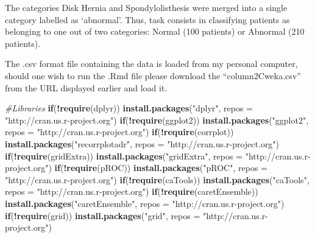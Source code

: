 \documentclass[
]{article}
\newenvironment{Shaded}{\begin{snugshade}}{\end{snugshade}}
\newcommand{\CommentTok}[1]{\textcolor[rgb]{0.56,0.35,0.01}{\textit{#1}}}
\newcommand{\ControlFlowTok}[1]{\textcolor[rgb]{0.13,0.29,0.53}{\textbf{#1}}}
\newcommand{\DataTypeTok}[1]{\textcolor[rgb]{0.13,0.29,0.53}{#1}}
\newcommand{\KeywordTok}[1]{\textcolor[rgb]{0.13,0.29,0.53}{\textbf{#1}}}
\newcommand{\NormalTok}[1]{#1}
\newcommand{\OperatorTok}[1]{\textcolor[rgb]{0.81,0.36,0.00}{\textbf{#1}}}
\newcommand{\StringTok}[1]{\textcolor[rgb]{0.31,0.60,0.02}{#1}}
\begin{document}
The categories Disk Hernia and Spondylolisthesis were merged into a
single category labelled as `abnormal'. Thus, task consists in
classifying patients as belonging to one out of two categories: Normal
(100 patients) or Abnormal (210 patients).

The .csv format file containing the data is loaded from my personal
computer, should one wish to run the .Rmd file please download the
``column2Cweka.csv'' from the URL displayed earlier and load it.

\begin{Shaded}
\begin{Highlighting}[]
\CommentTok{#Libraries}
\ControlFlowTok{if}\NormalTok{(}\OperatorTok{!}\KeywordTok{require}\NormalTok{(dplyr)) }\KeywordTok{install.packages}\NormalTok{(}\StringTok{"dplyr"}\NormalTok{, }\DataTypeTok{repos =} \StringTok{"http://cran.us.r-project.org"}\NormalTok{)}
\ControlFlowTok{if}\NormalTok{(}\OperatorTok{!}\KeywordTok{require}\NormalTok{(ggplot2)) }\KeywordTok{install.packages}\NormalTok{(}\StringTok{"ggplot2"}\NormalTok{, }\DataTypeTok{repos =} \StringTok{"http://cran.us.r-project.org"}\NormalTok{)}
\ControlFlowTok{if}\NormalTok{(}\OperatorTok{!}\KeywordTok{require}\NormalTok{(corrplot)) }\KeywordTok{install.packages}\NormalTok{(}\StringTok{"recorrplotadr"}\NormalTok{, }\DataTypeTok{repos =} \StringTok{"http://cran.us.r-project.org"}\NormalTok{)}
\ControlFlowTok{if}\NormalTok{(}\OperatorTok{!}\KeywordTok{require}\NormalTok{(gridExtra)) }\KeywordTok{install.packages}\NormalTok{(}\StringTok{"gridExtra"}\NormalTok{, }\DataTypeTok{repos =} \StringTok{"http://cran.us.r-project.org"}\NormalTok{)}
\ControlFlowTok{if}\NormalTok{(}\OperatorTok{!}\KeywordTok{require}\NormalTok{(pROC)) }\KeywordTok{install.packages}\NormalTok{(}\StringTok{"pROC"}\NormalTok{, }\DataTypeTok{repos =} \StringTok{"http://cran.us.r-project.org"}\NormalTok{)}
\ControlFlowTok{if}\NormalTok{(}\OperatorTok{!}\KeywordTok{require}\NormalTok{(caTools)) }\KeywordTok{install.packages}\NormalTok{(}\StringTok{"caTools"}\NormalTok{, }\DataTypeTok{repos =} \StringTok{"http://cran.us.r-project.org"}\NormalTok{)}
\ControlFlowTok{if}\NormalTok{(}\OperatorTok{!}\KeywordTok{require}\NormalTok{(caretEnsemble)) }\KeywordTok{install.packages}\NormalTok{(}\StringTok{"caretEnsemble"}\NormalTok{, }\DataTypeTok{repos =} \StringTok{"http://cran.us.r-project.org"}\NormalTok{)}
\ControlFlowTok{if}\NormalTok{(}\OperatorTok{!}\KeywordTok{require}\NormalTok{(grid)) }\KeywordTok{install.packages}\NormalTok{(}\StringTok{"grid"}\NormalTok{, }\DataTypeTok{repos =} \StringTok{"http://cran.us.r-project.org"}\NormalTok{)}

\end{Highlighting}
\end{Shaded}
\end{document}
